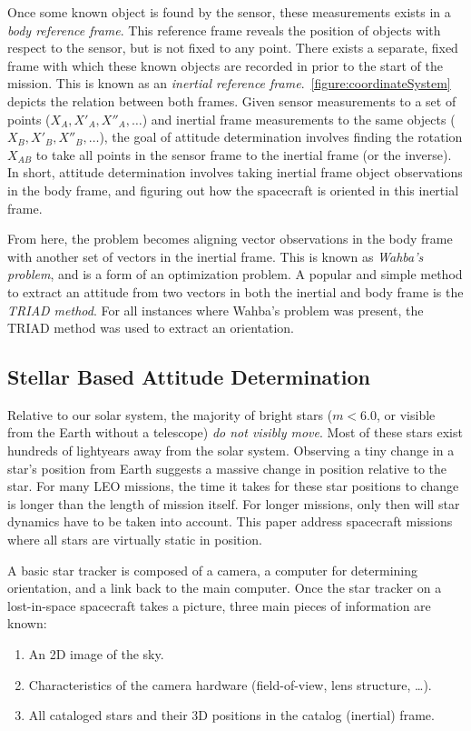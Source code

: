 Once some known object is found by the sensor, these measurements exists in a \textit{body reference frame}. This
reference frame reveals the position of objects with respect to the sensor, but is not fixed to any point. There exists
a separate, fixed frame with which these known objects are recorded in prior to the start of the mission. This is known
as an \textit{inertial reference frame}.~\autoref{figure:coordinateSystem} depicts the relation between both
frames. Given sensor measurements to a set of points ($X_A, X'_A, X''_A, \ldots$) and inertial frame
measurements to the same objects ($X_B, X'_B, X''_B, \ldots$), the goal of attitude determination involves
finding the rotation $X_{AB}$ to take all points in the sensor frame to the inertial frame (or the inverse). In
short, attitude determination involves taking inertial frame object observations in the body frame, and figuring out
how the spacecraft is oriented in this inertial frame.

From here, the problem becomes aligning vector observations in the body frame with another set of vectors in the
inertial frame. This is known as \textit{Wahba's problem}, and is a form of an optimization problem. A popular and
simple method to extract an attitude from two vectors in both the inertial and body frame is the \textit{TRIAD method}.
For all instances where Wahba's problem was present, the TRIAD method was used to extract an orientation.

\subsection{Stellar Based Attitude Determination}\label{subsec:stellarBasedAttitudeDetermination}
Relative to our solar system, the majority of bright stars ($m < 6.0$, or visible from the Earth without a telescope)
\textit{do not visibly move}. Most of these stars exist hundreds of lightyears away from the solar system. Observing a
tiny change in a star's position from Earth suggests a massive change in position relative to the star. For many LEO
missions, the time it takes for these star positions to change is longer than the length of mission itself. For longer
missions, only then will star dynamics have to be taken into account. This paper address spacecraft missions where all
stars are virtually static in position.

A basic star tracker is composed of a camera, a computer for determining orientation, and a link back to the main
computer. Once the star tracker on a lost-in-space spacecraft takes a picture, three main pieces of information are
known:
\begin{enumerate}
    \item An 2D image of the sky.
    \item Characteristics of the camera hardware (field-of-view, lens structure, \ldots).
    \item All cataloged stars and their 3D positions in the catalog (inertial) frame.
\end{enumerate}

